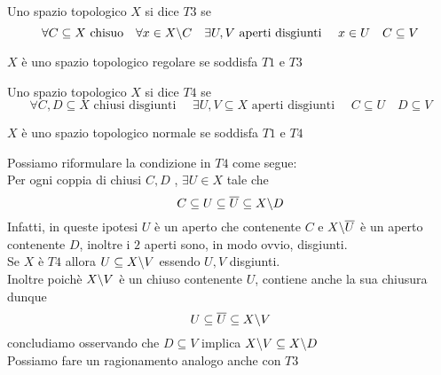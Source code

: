 \begin{defn}[T3]\bianco
Uno spazio topologico $X$ si dice $T3$ se 
$$ \forall C \subseteq X \text{ chisuo} \quad \forall x \in X \backslash C \quad \exists U,V \text{ aperti disgiunti } \quad x\in U \quad C \subseteq V$$
\end{defn}
\begin{defn}$X$ \`e uno spazio topologico regolare se soddisfa $T1$ e $T3$
\end{defn}
\spazio
\begin{defn}Uno spazio topologico $X$ si dice $T4$ se 
$$ \forall C, D \subseteq X \text{ chiusi disgiunti } \quad \exists U,V \subseteq X \text{ aperti disgiunti } \quad C \subseteq U \quad D\subseteq V $$
\end{defn}
\begin{defn}$X$ \`e uno spazio topologico normale se soddisfa $T1$ e $T4$
\end{defn}
\begin{oss}Possiamo riformulare la condizione in $T4$ come segue:\\
Per ogni coppia di chiusi $C,D$ , $\exists U \in X$ tale che 
$$ C \subseteq U \subseteq \overline{U} \subseteq X \backslash D$$
Infatti, in queste ipotesi $U$ \`e un aperto che contenente $C$  e $X\backslash \overline{U}$ \`e un aperto contenente $D$, inoltre i $2$ aperti sono, in modo ovvio, disgiunti.\\
Se $X$ \`e $T4$ allora $ U \subseteq X \backslash V $ essendo $U,V$ disgiunti.\\
Inoltre poich\`e $X \backslash V $ \`e un chiuso contenente $U$, contiene anche la sua chiusura dunque 
$$ U \subseteq \overline{ U } \subseteq X\backslash V $$ 
concludiamo osservando che $D \subseteq V $ implica  $X\backslash V \subseteq X \backslash D $\\
Possiamo fare un ragionamento analogo anche con $T3$
\end{oss}

